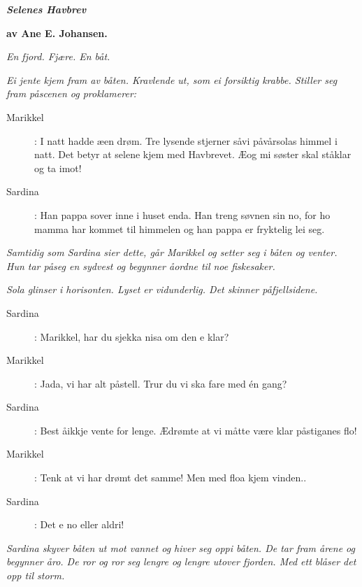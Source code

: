 \bigskip
\bigskip
\bigskip
\bigskip

\begin{center}
  \LARGE\bfseries{\textsl{Selenes Havbrev}}
\end{center}
\label{shtp1}

\bigskip
\bigskip
{\small 
\hfill \textbf{av Ane E. Johansen.}

\bigskip 
 \bigskip

\noindent \textit{\color{gray} En fjord. Fj\ae re. En b\aa t.}

\noindent \textit{\color{gray} Ei jente kjem fram av b\aa ten. Kravlende ut, som ei forsiktig krabbe. Stiller seg fram p\aa  scenen og proklamerer:}

\begin{description}
\item[Marikkel]: I natt hadde \ae  en dr\o{}m. Tre lysende stjerner s\aa  vi p\aa  v\aa rsolas himmel i natt. Det betyr at selene kjem med Havbrevet. \AE  og mi s\o{}ster skal st\aa  klar og ta imot! 
\item[Sardina]: Han pappa sover inne i huset enda. Han treng s\o{}vnen sin no, for ho mamma har kommet til himmelen og han pappa er fryktelig lei seg.
\end{description}

\noindent \textit{\color{gray} Samtidig som Sardina sier dette, g\aa r Marikkel og setter seg i b\aa ten og venter. Hun tar p\aa  seg en sydvest og begynner \aa  ordne til noe fiskesaker.}

\noindent \textit{\color{gray} Sola glinser i horisonten. Lyset er vidunderlig. Det skinner p\aa  fjellsidene.}

\begin{description}
\item[Sardina]: Marikkel, har du sjekka nisa om den e klar?
\item[Marikkel]: Jada, vi har alt p\aa  stell. Trur du vi ska fare med én gang?
\item[Sardina]: Best \aa  ikkje vente for lenge. \AE  dr\o{}mte at vi m\aa tte v\ae re klar p\aa  stiganes flo!
\item[Marikkel]: Tenk at vi har dr\o{}mt det samme! Men med floa kjem vinden..
\item[Sardina]: Det e no eller aldri!
\end{description}

\noindent \textit{\color{gray} Sardina skyver b\aa ten ut mot vannet og hiver seg oppi b\aa ten. De tar fram \aa rene og begynner \aa  ro. De ror og ror seg lengre og lengre utover fjorden. Med ett bl\aa ser det opp til storm.}

}
